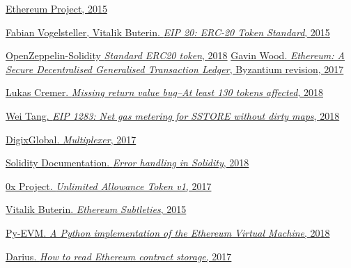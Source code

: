\documentclass[12pt]{article}
\begin{document}
\begin{thebibliography}{1}

 \href{https://www.ethereum.org}{Ethereum Project, 2015}
 
  \href{https://eips.ethereum.org/EIPS/eip-20}{Fabian Vogelsteller, Vitalik Buterin. {\em EIP 20: ERC-20 Token Standard}, 2015}

  \href{https://github.com/OpenZeppelin/openzeppelin-solidity/blob/v2.0.0/contracts/token/ERC20/ERC20.sol#L151-L164}{OpenZeppelin-Solidity {\em Standard ERC20 token}, 2018}
  \href{http://gavwood.com/paper.pdf}{Gavin Wood. {\em Ethereum: A Secure Decentralised Generalised Transaction Ledger}, Byzantium revision, 2017}
 	
  \href{https://medium.com/p/d67bf08521ca}{Lukas Cremer. {\em Missing return value bug--At least 130 tokens affected}, 2018}
 	
  \href{https://eips.ethereum.org/EIPS/eip-1283}{Wei Tang. {\em EIP 1283: Net gas metering for SSTORE without dirty maps}, 2018}
 	
  \href{https://github.com/DigixGlobal/multiplexer}{DigixGlobal. {\em Multiplexer}, 2017}
 	
  \href{https://solidity.readthedocs.io/en/latest/control-structures.html#error-handling-assert-require-revert-and-exceptions}{Solidity Documentation. {\em Error handling in Solidity}, 2018}
 	
  \href{https://github.com/0xProject/0x-monorepo/blob/48ff13e3e22bf9f71bc1a367f86aaa0ae89989ae/packages/contracts/contracts/tokens/ZRXToken/UnlimitedAllowanceToken_v1.sol#L43-L45}{0x Project. {\em Unlimited Allowance Token v1}, 2017}
 
 \href{https://github.com/ethereum/wiki/wiki/Subtleties}{Vitalik Buterin. {\em Ethereum Subtleties}, 2015}
 
 \href{https://github.com/ethereum/py-evm}{Py-EVM. {\em A Python implementation of the Ethereum Virtual Machine}, 2018}

 \href{https://medium.com/aigang-network/how-to-read-ethereum-contract-storage-44252c8af925}{Darius. {\em How to read Ethereum contract storage}, 2017}

\end{thebibliography}
\end{document}
